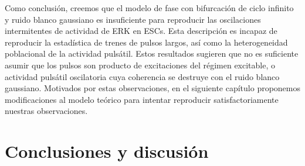 \documentclass[./main.tex]{subfiles}
\begin{document}
Como conclusión, creemos que el modelo de fase con bifurcación de ciclo infinito y ruido blanco gaussiano es insuficiente para reproducir las oscilaciones intermitentes de actividad de ERK en ESCs. Esta descripción es incapaz de reproducir la estadística de trenes de pulsos largos, así como la heterogeneidad poblacional de la actividad pulsátil. Estos resultados sugieren que no es suficiente asumir que los pulsos son producto de excitaciones del régimen excitable, o actividad pulsátil oscilatoria cuya coherencia se destruye con el ruido blanco gaussiano. Motivados por estas observaciones, en el siguiente capítulo proponemos modificaciones al modelo teórico para intentar reproducir satisfactoriamente nuestras observaciones. 




\section{Conclusiones y discusión}



\end{document}

